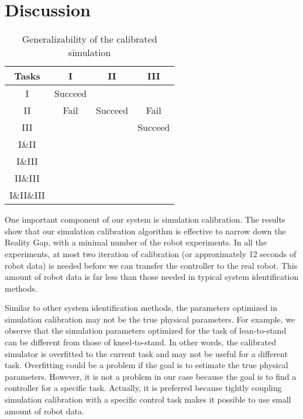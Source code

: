 \section{Discussion}
\begin{table}
\caption{Generalizability of the calibrated simulation}
 \label{table:generalize}
\begin{center}
\begin{tabular}{|c|c|c|c|}
\hline
 Tasks &  I &  II  &  III \\
 \hline
 I & Succeed & &  \\
 II & Fail & Succeed & Fail \\
 III & & & Succeed \\
 I\&II & & & \\
 I\&III & & & \\
 II\&III & & & \\
 I\&II\&III & & &\\
\hline
\end{tabular}
\end{center}
 \end{table}


One important component of our system is simulation calibration. The results show that our simulation calibration algorithm is effective to narrow down the Reality Gap, with a minimal number of the robot experiments. In all the experiments, at most two iteration of calibration (or approximately 12 seconds of robot data) is needed before we can transfer the controller to the real robot. This amount of robot data is far less than those needed in typical system identification methods.

Similar to other system identification methods, the parameters optimized in simulation calibration may not be the true physical parameters. For example, we observe that the simulation parameters optimized for the task of lean-to-stand can be different from those of kneel-to-stand. In other words, the calibrated simulator is overfitted to the current task and may not be useful for a different task. Overfitting could be a problem if the goal is to estimate the true physical parameters. However, it is not a problem in our case because the goal is to find a controller for a specific task. Actually, it is preferred because tightly coupling simulation calibration with a specific control task makes it possible to use small amount of robot data.

